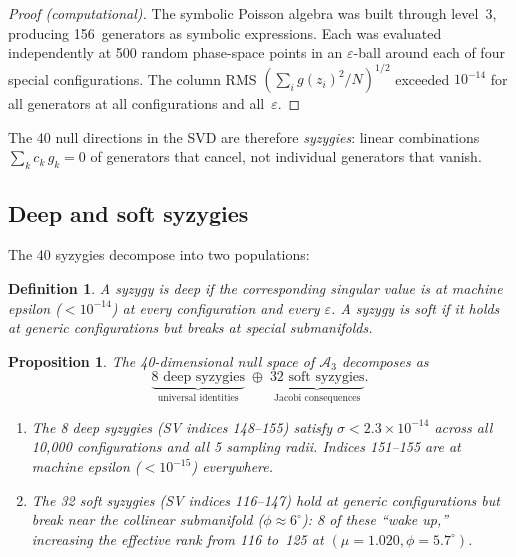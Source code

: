 \documentclass[11pt,a4paper]{article}
\newtheorem{proposition}[theorem]{Proposition}
\newtheorem{definition}[theorem]{Definition}
\theoremstyle{remark}
\newcommand{\cA}{\mathcal{A}}
\begin{document}
\begin{proof}[Proof (computational)]
The symbolic Poisson algebra was built through level~3,
producing 156~generators as symbolic expressions.  Each
was evaluated independently at 500 random phase-space
points in an $\varepsilon$-ball around each of four
special configurations.  The column RMS
$(\sum_i g(z_i)^2 / N)^{1/2}$ exceeded $10^{-14}$ for
all generators at all configurations and all~$\varepsilon$.
\end{proof}

The 40 null directions in the SVD are therefore
\emph{syzygies}: linear combinations
$\sum_k c_k\, g_k = 0$ of generators that cancel,
not individual generators that vanish.

\subsection{Deep and soft syzygies}

The 40 syzygies decompose into two populations:

\begin{definition}
A syzygy is \emph{deep} if the corresponding singular
value is at machine epsilon ($< 10^{-14}$) at every
configuration and every $\varepsilon$.  A syzygy is
\emph{soft} if it holds at generic configurations but
breaks at special submanifolds.
\end{definition}

\begin{proposition}
\label{prop:syzygy-decomp}
The 40-dimensional null space of $\cA_3$ decomposes as
\[
  \underbrace{8\text{ deep syzygies}}_{\text{universal
    identities}} \;\oplus\;
  \underbrace{32\text{ soft syzygies}}_{\text{Jacobi
    consequences}}.
\]
\begin{enumerate}[nosep]
  \item The 8 deep syzygies (SV indices 148--155) satisfy
    $\sigma < 2.3 \times 10^{-14}$ across all
    10{,}000 configurations and all 5 sampling radii.
    Indices 151--155 are at machine epsilon
    ($< 10^{-15}$) everywhere.

  \item The 32 soft syzygies (SV indices 116--147) hold
    at generic configurations but break near the
    collinear submanifold ($\phi \approx 6^\circ$): 8 of
    these ``wake up,'' increasing the effective rank
    from 116 to~125 at $(\mu = 1.020,
    \phi = 5.7^\circ)$.
\end{enumerate}
\end{proposition}
\end{document}
